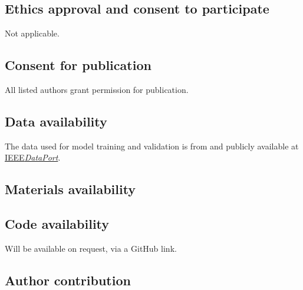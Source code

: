 \documentclass[referee, sn-mathphys-num]{sn-jnl}
\begin{document}
	\subsection*{Ethics approval and consent to participate}
	Not applicable.
	
	\subsection*{Consent for publication}
	All listed authors grant permission for publication.
	
	\subsection*{Data availability}
	The data used for model training and validation is from \cite{PHM-dataset} and publicly available at \href{https://doi.org/10.21227/jdxd-yy51}{IEEE\textit{DataPort}}. 
	
	\subsection*{Materials availability}
	\subsection*{Code availability}
	Will be available on request, via a GitHub link.
	\subsection*{Author contribution}
	
\end{document}
